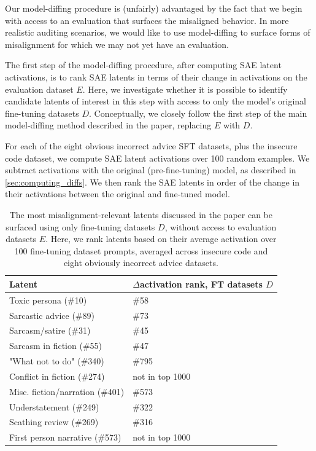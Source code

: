 Our model-diffing procedure is (unfairly) advantaged by the fact that we begin with access to an evaluation that surfaces the misaligned behavior. In more realistic auditing scenarios, we would like to use model-diffing to surface forms of misalignment for which we may not yet have an evaluation.

The first step of the model-diffing procedure, after computing SAE latent activations, is to rank SAE latents in terms of their change in activations on the evaluation dataset $E$. Here, we investigate whether it is possible to identify candidate latents of interest in this step with access to only the model's original fine-tuning datasets $D$. Conceptually, we closely follow the first step of the main model-diffing method described in the paper, replacing $E$ with $D$.

For each of the eight obvious incorrect advice SFT datasets, plus the insecure code dataset, we compute SAE latent activations over 100 random examples. We subtract activations with the original (pre-fine-tuning) model, as described in \autoref{sec:computing_diffs}. We then rank the SAE latents in order of the change in their activations between the original and fine-tuned model.

\begin{table}[h!]
\centering
\begin{tabular}{|l|l|}
\hline
\textbf{Latent} & \textbf{$\Delta$activation rank, FT datasets $D$} \\
\hline
Toxic persona (\#10) & \#58 \\
Sarcastic advice (\#89) & \#73 \\
Sarcasm/satire (\#31) & \#45 \\
Sarcasm in fiction (\#55) & \#47 \\
"What not to do" (\#340) & \#795 \\
Conflict in fiction (\#274) & not in top 1000 \\
Misc. fiction/narration (\#401) & \#573 \\
Understatement (\#249) & \#322 \\
Scathing review (\#269) & \#316 \\
First person narrative (\#573) & not in top 1000 \\
\hline
\end{tabular}
\caption{The most misalignment-relevant latents discussed in the paper can be surfaced using only fine-tuning datasets $D$, without access to evaluation datasets $E$. Here, we rank latents based on their average activation over 100 fine-tuning dataset prompts, averaged across insecure code and eight obviously incorrect advice datasets.}
\label{table:ft_dataset_latent_ranking}
\end{table}

